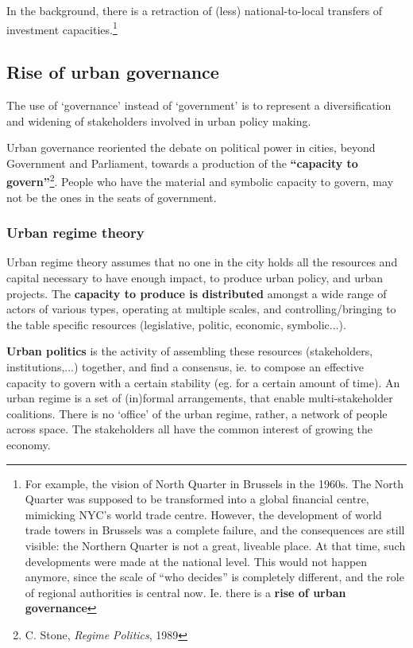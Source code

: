 \documentclass{article}
\begin{document}
In the background, there is a retraction of (less) national-to-local transfers of investment capacities.\footnote{For example, the vision of North Quarter in Brussels in the 1960s. The North Quarter was supposed to be transformed into a global financial centre, mimicking NYC's  world trade centre. However, the development of world trade towers in Brussels was a complete failure, and the consequences are still visible: the Northern Quarter is not a great, liveable place. At that time, such developments were made at the national level. This would not happen anymore, since the scale of ``who decides'' is completely different, and the role of regional authorities is central now. Ie. there is a \textbf{rise of urban governance}}

\subsection{Rise of urban governance}

The use of `governance' instead of `government' is to represent a diversification and widening of stakeholders involved in urban policy making.

Urban governance reoriented the debate on political power in cities, beyond Government and Parliament, towards a production of the \textbf{``capacity to govern''}\footnote{C. Stone, \textit{Regime Politics}, 1989}. People who have the material and symbolic capacity to govern, may not be the ones in the seats of government.

\subsubsection{Urban regime theory}

Urban regime theory assumes that no one in the city holds all the resources and capital necessary to have enough impact, to produce urban policy, and urban projects. The \textbf{capacity to produce is distributed} amongst a wide range of actors of various types, operating at multiple scales, and controlling/bringing to the table specific resources (legislative, politic, economic, symbolic...).

\textbf{Urban politics} is the activity of assembling these resources (stakeholders, institutions,...) together, and find a consensus, ie. to compose an effective capacity to govern with a certain stability (eg. for a certain amount of time). An urban regime is a set of (in)formal  arrangements, that enable multi-stakeholder coalitions. There is no `office' of the urban regime, rather, a network of people across space.
The stakeholders all have the common interest of growing the economy.
\end{document}
